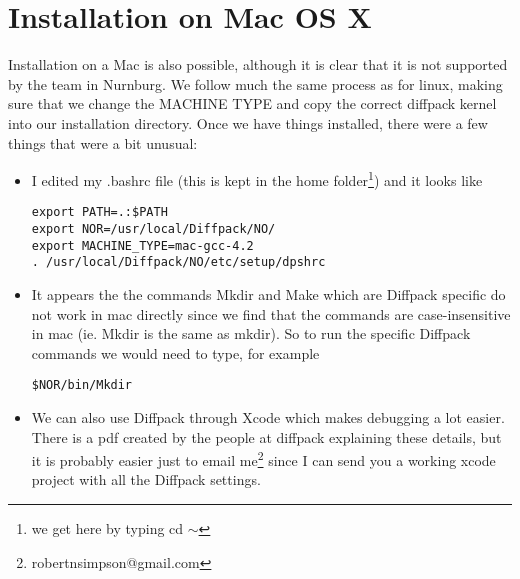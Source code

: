 \section{Installation on Mac OS X}

Installation on a Mac is also possible, although it is clear that it is not supported by the team in Nurnburg. We follow much the same process as for linux, making sure that we change the MACHINE TYPE and copy the correct diffpack kernel into our installation directory. Once we have things installed, there were a few things that were a bit unusual:
\begin{itemize}
\item I edited my .bashrc file (this is kept in the home folder\footnote{we get here by typing cd $\sim$}) and it looks like
\begin{verbatim}
export PATH=.:$PATH
export NOR=/usr/local/Diffpack/NO/
export MACHINE_TYPE=mac-gcc-4.2
. /usr/local/Diffpack/NO/etc/setup/dpshrc
\end{verbatim}
\item It appears the the commands Mkdir and Make which are Diffpack specific do not work in mac directly since we find that the commands are case-insensitive in mac (ie. Mkdir is the same as mkdir). So to run the specific Diffpack commands we would need to type, for example
\begin{verbatim}
$NOR/bin/Mkdir
\end{verbatim}
\item We can also use Diffpack through Xcode which makes debugging a lot easier. There is a pdf created by the people at diffpack explaining these details, but it is probably easier just to email me\footnote{robertnsimpson@gmail.com} since I can send you a working xcode project with all the Diffpack settings.
\end{itemize}













